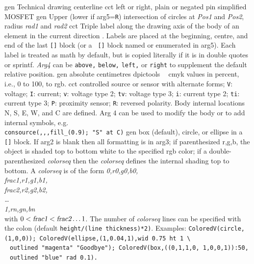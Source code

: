   {gen}%
  {Technical drawing centerline}%
%
  {cct}%
  {left or right, plain or negated pin simplified MOSFET}%
%
  {gen}%
  {Upper (lower if arg5={\tt R}) intersection of circles at
    {\sl Pos1} and {\sl Pos2}, radius {\sl rad1} and {\sl rad2}}
%
  {cct}%
  {Triple label along the drawing axis of the body of an element in the
    current direction .  Labels are placed at the
    beginning, centre, and end of the last {\tt []} block (or a {\tt
    []} block named or enumerated in arg5). Each label is treated as
    math by default, but is copied literally if it is in double quotes
    or sprintf.  {\sl Arg4} can be {\tt above,} {\tt below,} {\tt left,}
    or {\tt right} to supplement the default relative position.}%
%
  {gen}%
  {absolute centimetres}%
%
  {dpictools}%
  {$\;\;$ cmyk values in percent, i.e., 0 to 100, to rgb.}%
%
  {cct}%
  {controlled source or sensor with alternate forms;
   {\tt V}: voltage;
   {\tt I}: current;
   {\tt v}: voltage type 2;
   {\tt tv}: voltage type 3;
   {\tt i}: current type 2;
   {\tt ti}: current type 3;
   {\tt P}: proximity sensor;
   {\tt R}: reversed polarity.
  Body internal locations N, S, E, W, and C are defined.
  Arg 4 can be used to modify the body or to add internal symbols, e.g.\\
    {\tt consource(,{,},fill\_(0.9); "S" at C)}}%
%
  {gen}%
  {box (default), circle, or ellipse in a {\tt []} block.
   If arg2 is blank
   then all formatting is in arg3; if parenthesized r,g,b, the object
   is shaded top to bottom white to the specified rgb color; if a
   double-parenthesized {\sl colorseq} then the {\sl colorseq}
   defines the internal
   shading top to bottom.  A {\sl colorseq} is of the form
   {\sl 0,r0,g0,b0,\\
    frac1,r1,g1,b1,\\
    frac2,r2,g2,b2,\\
   \ldots\\
    1,rn,gn,bn}\\
   with $0 < \hbox{\sl frac1} < \hbox{\sl frac2} \ldots 1$.
   The number of {\sl colorseq} lines can be specified with the colon
   (default {\tt height/(line thickness)*2)}.
   Examples: {\tt ColoredV(circle,(1,0,0));
   ColoredV(ellipse,(1,0.04,1),wid 0.75 ht 1 \textbackslash\\
    $\;$ outlined "magenta" "Goodbye");
   ColoredV(box,((0,1,1,0, 1,0,0,1)):50, \\
    $\;$ outlined "blue" rad 0.1).} }%

